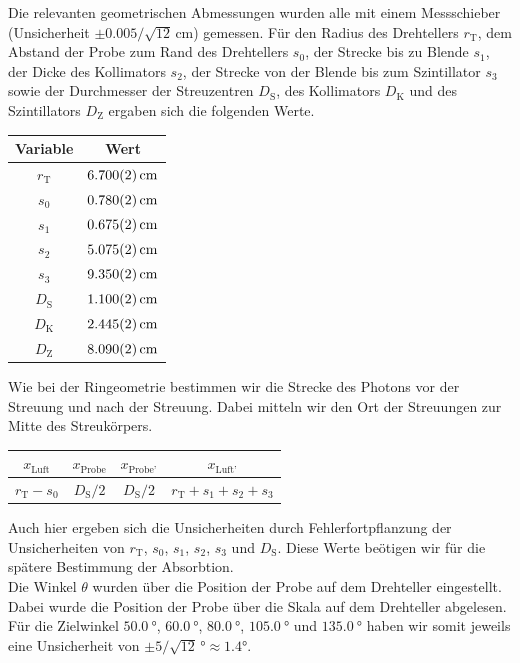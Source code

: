 \noindent
Die relevanten geometrischen Abmessungen wurden alle mit einem Messschieber (Unsicherheit $\pm 0.005/\sqrt{12}\,\unit{\centi\meter}$) gemessen. Für den Radius des Drehtellers $r_{\text{T}}$, dem Abstand der Probe zum Rand des Drehtellers $s_0$, der Strecke bis zu Blende $s_1$, der Dicke des Kollimators $s_2$, der Strecke von der Blende bis zum Szintillator $s_3$ sowie der Durchmesser der Streuzentren $D_{\text{S}}$, des Kollimators $D_{\text{K}}$ und des Szintillators $D_{\text{Z}}$ ergaben sich die folgenden Werte.
\begin{center}
    \begin{tabular}{|c|c|}
        \hline
        \textbf{Variable} & \textbf{Wert}\\
        \hline
        $r_{\text{T}}$ & $\SI{6.700 \pm 0.002}{\centi\meter}$ \\
        \hline
        $s_0$ & $\SI{0.780 \pm 0.002}{\centi\meter}$ \\
        \hline
        $s_1$ & $\SI{0.675 \pm 0.002}{\centi\meter}$ \\
        \hline
        $s_2$ & $\SI{5.075 \pm 0.002}{\centi\meter}$ \\
        \hline
        $s_3$ & $\SI{9.35 \pm 0.002}{\centi\meter}$ \\
        \hline
        $D_{\text{S}}$ & $\SI{1.100 \pm 0.002}{\centi\meter}$ \\
        \hline
        $D_{\text{K}}$ & $\SI{2.445 \pm 0.002}{\centi\meter}$ \\
        \hline
        $D_{\text{Z}}$ & $\SI{8.090 \pm 0.002}{\centi\meter}$ \\
        \hline
    \end{tabular}
\end{center}
Wie bei der Ringeometrie bestimmen wir die Strecke des Photons vor der Streuung und nach der Streuung. Dabei mitteln wir den Ort der Streuungen zur Mitte des Streukörpers.
\begin{center}
    \begin{tabular}{|c|c|c|c|}
        \hline
        $x_{\text{Luft}}$ & $x_{\text{Probe}}$ & $x_{\text{Probe'}}$ & $x_{\text{Luft'}}$ \\
        \hline
        $r_{\text{T}} - s_0$ & $D_{\text{S}}/2$ & $D_{\text{S}}/2$ & $r_{\text{T}} + s_1 + s_2 + s_3$ \\
        \hline
    \end{tabular}
\end{center}
Auch hier ergeben sich die Unsicherheiten durch Fehlerfortpflanzung der Unsicherheiten von $r_{\text{T}}$, $s_0$, $s_1$, $s_2$, $s_3$ und $D_{\text{S}}$. Diese Werte beötigen wir für die spätere Bestimmung der Absorbtion.\\
Die Winkel $\theta$ wurden über die Position der Probe auf dem Drehteller eingestellt. Dabei wurde die Position der Probe über die Skala auf dem Drehteller abgelesen. Für die Zielwinkel $\SI{50.0}{\degree}$, $\SI{60.0}{\degree}$, $\SI{80.0}{\degree}$, $\SI{105.0}{\degree}$ und $\SI{135.0}{\degree}$ haben wir somit jeweils eine Unsicherheit von $\pm 5/\sqrt{12}\,\unit{\degree} \approx 1.4 \unit{\degree}$.

